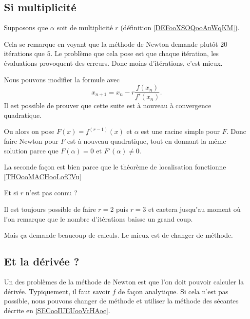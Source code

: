 \subsection{Si multiplicité}

Supposons que \( \alpha\) soit de multiplicité \( r\) (définition \ref{DEFooXSOQooAnWqKM}).

Cela se remarque en voyant que la méthode de Newton demande plutôt \( 20\) itérations que \( 5\). Le problème que cela pose est que chaque itération, les évaluations provoquent des erreurs. Donc moins d'itérations, c'est mieux.

Nous pouvons modifier la formule avec
\begin{equation}
    x_{n+1}=x_n-r\frac{ f(x_n) }{ f'(x_n) }.
\end{equation}
Il est possible de prouver que cette suite est à nouveau à convergence quadratique.

Ou alors on pose \( F(x)=f^{(r-1)}(x)\) et \( \alpha\) est une racine simple pour \( F\). Donc faire Newton pour \( F\) est à nouveau quadratique, tout en donnant la même solution parce que \( F(\alpha)=0\) et \( F'(\alpha)\neq 0\).

La seconde façon est bien parce que le théorème de localisation fonctionne \ref{THOooMACHooLofCVu}

Et si \( r\) n'est pas connu ?

Il est toujours possible de faire \( r=2\) puis \( r=3\) et caetera jusqu'au moment où l'on remarque que le nombre d'itérations baisse un grand coup.

Mais ça demande beaucoup de calculs.  Le mieux est de changer de méthode.

\subsection{Et la dérivée ?}

Un des problèmes de la méthode de Newton est que l'on doit pouvoir calculer la dérivée. Typiquement, il faut savoir \( f\) de façon analytique. Si cela n'est pas possible, nous pouvons changer de méthode et utiliser la méthode des sécantes décrite en \ref{SECooIUEUooVcHAoc}.


